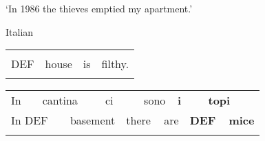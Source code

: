 \begin{styleTranslation}
‘In 1986 the thieves emptied my apartment.’

\end{styleTranslation}

\begin{listWWNumileveli}
\item {}

\begin{styleExample}
Italian

\end{styleExample}

\end{listWWNumileveli}

\begin{tabular}{llll}
\lsptoprule
\multicolumn{4}{l}{La

}\\
DEF & house & is & filthy.\\
\lspbottomrule
\end{tabular}

\begin{tabular}{llllllllllll}
\lsptoprule
In & \multicolumn{2}{l}{cantina

} & \multicolumn{2}{l}{ci

} & \multicolumn{2}{l}{sono

} & \multicolumn{2}{l}{{\bfseries i}

} & \multicolumn{2}{l}{{\bfseries topi}

} & \\
\multicolumn{2}{l}{In DEF

} & \multicolumn{2}{l}{basement

} & \multicolumn{2}{l}{there

} & \multicolumn{2}{l}{are

} & \multicolumn{2}{l}{{\bfseries DEF}

} & \multicolumn{2}{l}{{\bfseries mice}

}\\
\lspbottomrule
\end{tabular}


